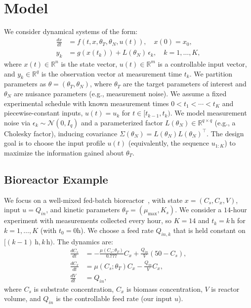 \documentclass[conference]{IEEEtran}
\begin{document}
\section{Model}
We consider dynamical systems of the form:
\begin{equation}\label{eq:system}
\begin{aligned}
\frac{dx}{dt} &= f(t, x, \theta_T, \theta_N, u(t)), \quad x(0) = x_0,\\
y_k &= g(x(t_k)) + L(\theta_N)\,\epsilon_k, \quad k = 1, \ldots, K,
\end{aligned}
\end{equation}
where $x(t) \in \mathbb{R}^n$ is the state vector, $u(t) \in \mathbb{R}^m$ is a controllable input vector, and $y_k \in \mathbb{R}^q$ is the observation vector at measurement time $t_k$.
We partition parameters as $\theta = (\theta_T, \theta_N)$, where $\theta_T$ are the target parameters of interest and $\theta_N$ are nuisance parameters (e.g., measurement noise).
We assume a fixed experimental schedule with known measurement times $0 < t_1 < \cdots < t_K$ and piecewise-constant inputs, $u(t)=u_k$ for $t \in [t_{k-1}, t_k)$.
We model measurement noise via $\epsilon_k \sim \mathcal{N}(0, I_q)$ and a parameterized factor $L(\theta_N) \in \mathbb{R}^{q \times q}$ (e.g., a Cholesky factor), inducing covariance $\Sigma(\theta_N) = L(\theta_N)L(\theta_N)^\top$.
The design goal is to choose the input profile $u(t)$ (equivalently, the sequence $u_{1:K}$) to maximize the information gained about $\theta_T$.

\subsection{Bioreactor Example}
We focus on a well-mixed fed-batch bioreactor~\citep{versyck}, with state $x = (C_s, C_x, V)$, input $u = Q_{in}$, and kinetic parameters $\theta_T = (\mu_{\max}, K_s)$.
We consider a $14$-hour experiment with measurements collected every hour, so $K=14$ and $t_k = k\,\mathrm{h}$ for $k=1,\ldots,K$ (with $t_0=0 \mathrm{h}$).
We choose a feed rate $Q_{in,k}$ that is held constant on $[(k-1)\,\mathrm{h}, k\,\mathrm{h})$.
The dynamics are:
\begin{equation}\label{eq:bioreactor}
\begin{aligned}
\frac{dC_s}{dt} &= -\frac{\mu(C_s; \theta_T)}{0.777} C_x + \frac{Q_{in}}{V}(50 - C_s),\\
\frac{dC_x}{dt} &= \mu(C_s; \theta_T) C_x - \frac{Q_{in}}{V}C_x,\\
\frac{dV}{dt} &= Q_{in},
\end{aligned}
\end{equation}
where $C_s$ is substrate concentration, $C_x$ is biomass concentration, $V$ is reactor volume, and $Q_{in}$ is the controllable feed rate (our input $u$).
\end{document}

